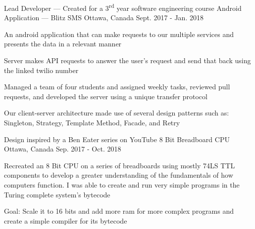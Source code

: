 
\begin{cventries}
	\cventry
		{Lead Developer --- Created for a 3\textsuperscript{rd} year software engineering course}
		{Android Application --- Blitz SMS}
		{Ottawa, Canada}
		{Sept. 2017 - Jan. 2018}
		{\begin{cvitems}
			\item An android application that can make requests to our multiple services and presents the data in a relevant manner
			\item Server makes API requests to answer the user's request and send that back using the linked twilio number
			\item Managed a team of four students and assigned weekly tasks, reviewed pull requests, and developed the server using a unique transfer protocol
			\item Our client-server architecture made use of several design patterns such as: Singleton, Strategy, Template Method, Facade, and Retry
		\end{cvitems}}

	\cventry
		{Design inspired by a Ben Eater series on YouTube}
		{8 Bit Breadboard CPU}
		{Ottawa, Canada}
		{Sep. 2017 - Oct. 2018}
		{\begin{cvitems}
			\item Recreated an 8 Bit CPU on a series of breadboards using mostly 74LS TTL components to develop a greater understanding of the fundamentals of how computers function. I was able to create and run very simple programs in the Turing complete system's bytecode
			\item Goal: Scale it to 16 bits and add more ram for more complex programs and create a simple compiler for its bytecode
		\end{cvitems}}
\end{cventries}